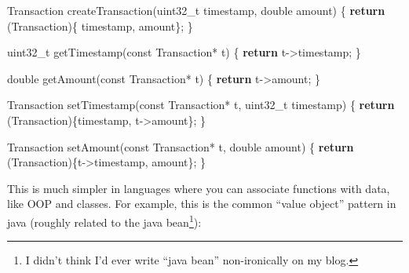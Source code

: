 \documentclass[]{article}
\newenvironment{Shaded}{}{}
\newcommand{\ControlFlowTok}[1]{\textcolor[rgb]{0.00,0.44,0.13}{\textbf{#1}}}
\newcommand{\DataTypeTok}[1]{\textcolor[rgb]{0.56,0.13,0.00}{#1}}
\newcommand{\NormalTok}[1]{#1}
\newcommand{\OperatorTok}[1]{\textcolor[rgb]{0.40,0.40,0.40}{#1}}
\begin{document}
\begin{Shaded}
\begin{Highlighting}[]
\NormalTok{Transaction createTransaction}\OperatorTok{(}\DataTypeTok{uint32\_t}\NormalTok{ timestamp}\OperatorTok{,} \DataTypeTok{double}\NormalTok{ amount}\OperatorTok{)} \OperatorTok{\{}
    \ControlFlowTok{return} \OperatorTok{(}\NormalTok{Transaction}\OperatorTok{)\{}\NormalTok{ timestamp}\OperatorTok{,}\NormalTok{ amount}\OperatorTok{\};}
\OperatorTok{\}}

\DataTypeTok{uint32\_t}\NormalTok{ getTimestamp}\OperatorTok{(}\DataTypeTok{const}\NormalTok{ Transaction}\OperatorTok{*}\NormalTok{ t}\OperatorTok{)} \OperatorTok{\{}
    \ControlFlowTok{return}\NormalTok{ t}\OperatorTok{{-}\textgreater{}}\NormalTok{timestamp}\OperatorTok{;}
\OperatorTok{\}}

\DataTypeTok{double}\NormalTok{ getAmount}\OperatorTok{(}\DataTypeTok{const}\NormalTok{ Transaction}\OperatorTok{*}\NormalTok{ t}\OperatorTok{)} \OperatorTok{\{}
    \ControlFlowTok{return}\NormalTok{ t}\OperatorTok{{-}\textgreater{}}\NormalTok{amount}\OperatorTok{;}
\OperatorTok{\}}

\NormalTok{Transaction setTimestamp}\OperatorTok{(}\DataTypeTok{const}\NormalTok{ Transaction}\OperatorTok{*}\NormalTok{ t}\OperatorTok{,} \DataTypeTok{uint32\_t}\NormalTok{ timestamp}\OperatorTok{)} \OperatorTok{\{}
    \ControlFlowTok{return} \OperatorTok{(}\NormalTok{Transaction}\OperatorTok{)\{}\NormalTok{timestamp}\OperatorTok{,}\NormalTok{ t}\OperatorTok{{-}\textgreater{}}\NormalTok{amount}\OperatorTok{\};}
\OperatorTok{\}}

\NormalTok{Transaction setAmount}\OperatorTok{(}\DataTypeTok{const}\NormalTok{ Transaction}\OperatorTok{*}\NormalTok{ t}\OperatorTok{,} \DataTypeTok{double}\NormalTok{ amount}\OperatorTok{)} \OperatorTok{\{}
    \ControlFlowTok{return} \OperatorTok{(}\NormalTok{Transaction}\OperatorTok{)\{}\NormalTok{t}\OperatorTok{{-}\textgreater{}}\NormalTok{timestamp}\OperatorTok{,}\NormalTok{ amount}\OperatorTok{\};}
\OperatorTok{\}}
\end{Highlighting}
\end{Shaded}

This is much simpler in languages where you can associate functions with data,
like OOP and classes. For example, this is the common ``value object'' pattern
in java (roughly related to the java bean\footnote{I didn't think I'd ever write
  ``java bean'' non-ironically on my blog.}):
\end{document}
